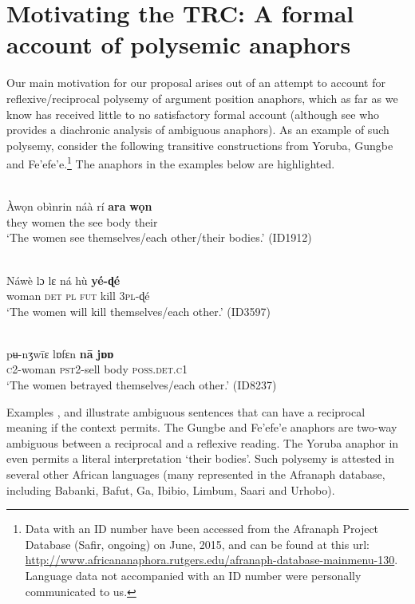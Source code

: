 \documentclass[output=paper]{langsci/langscibook}
\begin{document}
\section{Motivating the TRC: A formal account of polysemic anaphors}\label{sec:safir:2}



Our main motivation for our proposal arises out of an attempt to account for reflexive/reciprocal polysemy of argument position anaphors, which as far as we know has received little to no satisfactory formal account (although see \citealt{Heine1999} who provides a diachronic analysis of ambiguous anaphors). As an example of such polysemy, consider the following transitive constructions from Yoruba, Gungbe and Fe'efe'e.\footnote{Data with an ID number have been accessed from the Afranaph Project Database (Safir, ongoing) on June, 2015, and can be found at this url: \url{http://www.africananaphora.rutgers.edu/afranaph-database-mainmenu-130}. Language data not accompanied with an ID number were personally communicated to us.} The anaphors in the examples below are highlighted.



\ea\label{ex:safir:2}
 \\
\gll Àwọn     obìnrin   náà  rí   \textbf{ara}   \textbf{wọn} \\
they     women   the   see   body   their\\
\glt  ‘The women see themselves/each other/their bodies.’ {(ID1912)}
\z


\ea\label{ex:safir:3}
 \\
\gll Náwè     lɔ  lɛ  ná  hù  \textbf{yé-ɖé} \\
woman    \textsc{det}  \textsc{pl}  \textsc{fut}  kill  \textsc{3pl}-ɖé \\
\glt ‘The women will kill themselves/each other.’ (ID3597) 
\z


\ea\label{ex:safir:4}
 \\
\gll pʉ-nʒwīɛ   lɒfɛn     \textbf{nā}   \textbf{jɒɒ} \\
\textsc{c}{2-woman}   {\textsc{pst2}}-sell   body   \textsc{poss.det.c1}\\
\glt ‘The women betrayed themselves/each other.’ {(ID8237)} 
\z


Examples ,  and  illustrate ambiguous sentences that can have a reciprocal meaning if the context permits. The Gungbe and Fe'efe'e anaphors are two-way ambiguous between a reciprocal and a reflexive reading. The Yoruba anaphor in  even permits a literal interpretation ‘their bodies’. Such polysemy is attested in several other African languages (many represented in the Afranaph database, including Babanki, Bafut, Ga, Ibibio, Limbum, Saari and Urhobo).
\end{document}
